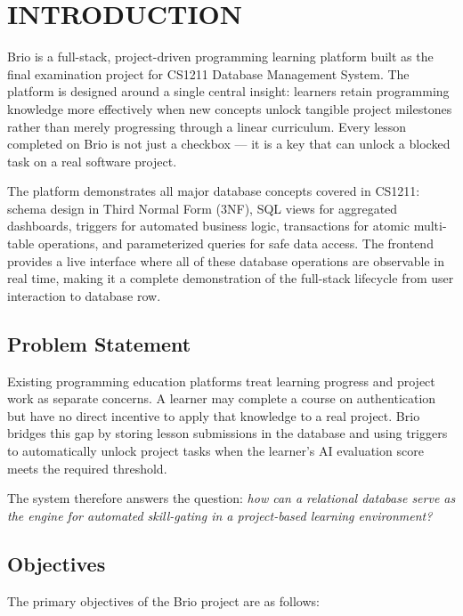 \documentclass[12pt,a4paper]{article}
\begin{document}
\section{INTRODUCTION}

Brio is a full-stack, project-driven programming learning platform built as the final examination
project for CS1211 Database Management System. The platform is designed around a single central
insight: learners retain programming knowledge more effectively when new concepts unlock tangible
project milestones rather than merely progressing through a linear curriculum. Every lesson
completed on Brio is not just a checkbox --- it is a key that can unlock a blocked task on a real
software project.

The platform demonstrates all major database concepts covered in CS1211: schema design in Third
Normal Form (3NF), SQL views for aggregated dashboards, triggers for automated business logic,
transactions for atomic multi-table operations, and parameterized queries for safe data access.
The frontend provides a live interface where all of these database operations are observable in
real time, making it a complete demonstration of the full-stack lifecycle from user interaction
to database row.

\subsection{Problem Statement}

Existing programming education platforms treat learning progress and project work as separate
concerns. A learner may complete a course on authentication but have no direct incentive to
apply that knowledge to a real project. Brio bridges this gap by storing lesson submissions in
the database and using triggers to automatically unlock project tasks when the learner's AI
evaluation score meets the required threshold.

The system therefore answers the question: \textit{how can a relational database serve as the
engine for automated skill-gating in a project-based learning environment?}

\subsection{Objectives}

The primary objectives of the Brio project are as follows:
\end{document}
